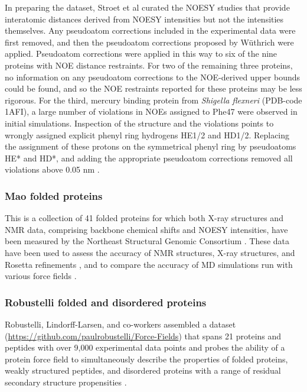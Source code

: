 \documentclass[9pt,review]{livecoms}
\begin{document}
In preparing the dataset, Stroet et al curated the NOESY studies that provide interatomic distances derived from NOESY intensities but not the intensities themselves.
Any pseudoatom corrections included in the experimental data were first removed, and then the pseudoatom corrections proposed by W\"{u}thrich \cite{wuthrich_nmr_1986} were applied.
Pseudoatom corrections were applied in this way to six of the nine proteins with NOE distance restraints.
For two of the remaining three proteins, no information on any pseudoatom corrections to the NOE-derived upper bounds could be found, and so the NOE restraints reported for these proteins may be less rigorous.
For the third, mercury binding protein from \textit{Shigella flexneri} (PDB-code 1AFI), a large number of violations in NOEs assigned to Phe47 were observed in initial simulations.
Inspection of the structure and the violations points to wrongly assigned explicit phenyl ring hydrogens HE1/2 and HD1/2.
Replacing the assignment of these protons on the symmetrical phenyl ring by pseudoatoms HE* and HD*, and adding the appropriate pseudoatom corrections \cite{wuthrich_nmr_1986} removed all violations above 0.05 nm \cite{stroet_validation_2024}.

\subsubsection{Mao folded proteins}
\label{sub2:mao}

This is a collection of 41 folded proteins for which both X-ray structures and NMR data, comprising backbone chemical shifts and NOESY intensities, have been measured by the Northeast Structural Genomic Consortium \cite{mao_protein_2014}.
These data have been used to assess the accuracy of NMR structures, X-ray structures, and Rosetta refinements \cite{mao_protein_2014}, and to compare the accuracy of MD simulations run with various force fields \cite{robustelli_developing_2018,piana_development_2020}.

\subsubsection{Robustelli folded and disordered proteins}
\label{sub2:robustelli}

Robustelli, Lindorff-Larsen, and co-workers assembled a dataset (\url{https://github.com/paulrobustelli/Force-Fields}) that spans 21 proteins and peptides with over 9,000 experimental data points and probes the ability of a protein force field to simultaneously describe the properties of folded proteins, weakly structured peptides, and disordered proteins with a range of residual secondary structure propensities \cite{lindorff-larsen_improved_2010,lindorff2012systematic,piana_water_2015,robustelli_developing_2018,piana_development_2020}.
\end{document}
